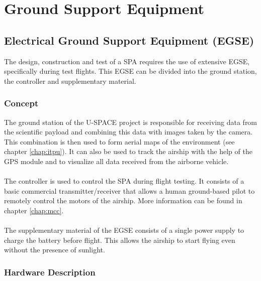 \chapter{Ground Support Equipment}
\label{chap:ground_support}

\section{Electrical Ground Support Equipment (EGSE)}

The design, construction and test of a \ac{SPA} requires the use of extensive \ac{EGSE}, specifically during test flights. This \ac{EGSE} can be divided into the ground station, the controller and supplementary material.

\subsection{Concept}

The ground station of the \ac{U-SPACE} project is responsible for receiving data from the scientific payload and combining this data with images taken by the camera. This combination is then used to form aerial maps of the environment (see chapter \ref{chap:itpu}). It can also be used to track the airship with the help of the \ac{GPS} module and to visualize all data received from the airborne vehicle.
\\
\\
The controller is used to control the \ac{SPA} during flight testing. It consists of a basic commercial transmitter/receiver  that allows a human ground-based pilot to remotely control the motors of the airship. More information can be found in chapter \ref{chap:mcc}.
\\
\\
The supplementary material of the \ac{EGSE} consists of a single power supply to charge the battery before flight. This allows the airship to start flying even without the presence of sunlight.

\subsection{Hardware Description}

